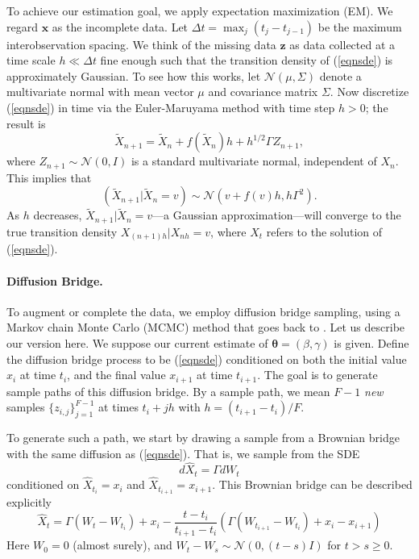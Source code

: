 \documentclass{article}
\newcommand{\btheta}{\ensuremath{\bm{\theta}}}
\newcommand{\bx}{\ensuremath{\mathbf{x}}}
\newcommand{\bz}{\ensuremath{\mathbf{z}}}
\begin{document}
To achieve our estimation goal, we apply expectation maximization (EM).  We regard $\bx$ as the incomplete data.  Let $\Delta t = \max_{j} (t_j - t_{j-1})$ be the maximum interobservation spacing.  We think of the missing data $\bz$ as data collected at a time scale $h \ll \Delta t$ fine enough such that the transition density of (\ref{eqnsde}) is approximately Gaussian.  To see how this works, let $\mathcal{N}(\mu, \Sigma)$ denote a multivariate normal with mean vector $\mu$ and covariance matrix $\Sigma$.  Now discretize (\ref{eqnsde}) in time via the Euler-Maruyama method with time step $h > 0$; the result is
\begin{equation} \label{eqneuler}
\widetilde{X}_{n+1} = \widetilde{X}_n + f(\widetilde{X}_n) h + h^{1/2} \Gamma Z_{n+1},
\end{equation}
where $Z_{n+1} \sim \mathcal{N}(0, I)$ is a standard multivariate normal, independent of $X_n$.  This implies that
\begin{equation}
\label{eqncondden}
(\widetilde{X}_{n+1} | \widetilde{X}_n = v) \sim \mathcal{N}(v + f(v) h, h \Gamma^2).
\end{equation}
As $h$ decreases, $\widetilde{X}_{n+1} | \widetilde{X}_n = v$---a Gaussian approximation---will converge to the true transition density $X_{(n+1)h} | X_{nh} = v$, where $X_t$ refers to the solution of (\ref{eqnsde}).

\paragraph{Diffusion Bridge.} To augment or complete the data, we employ diffusion bridge sampling, using a Markov chain Monte Carlo (MCMC) method that goes back to \cite{roberts_inference_2001, papaspiliopoulos_data_2013}.  Let us describe our version here.  We suppose our current estimate of $\btheta = (\beta, \gamma)$ is given.  Define the diffusion bridge process to be (\ref{eqnsde}) conditioned on both the initial value $x_i$ at time $t_i$, and the final value $x_{i+1}$ at time $t_{i+1}$.  The goal is to generate sample paths of this diffusion bridge.  By a sample path, we mean $F-1$ \emph{new} samples $\{z_{i,j}\}_{j=1}^{F-1}$ at times $t_i + j h$ with $h = (t_{i+1} - t_i)/F$.

To generate such a path, we start by drawing a sample from a Brownian bridge with the same diffusion as (\ref{eqnsde}).  That is, we sample from the SDE
\begin{equation}
\label{eqnbbridgesde}
d\widehat{X}_t = \Gamma dW_t
\end{equation}
conditioned on $\widehat{X}_{t_i} = x_i$ and $\widehat{X}_{t_{i+1}} = x_{i+1}$.  This Brownian bridge can be described explicitly
\begin{equation}
\label{eqnbbridge}
\widehat{X}_t = \Gamma (W_{t} - W_{t_i}) + x_i - \frac{t - t_i}{t_{i+1} - t_i} (\Gamma (W_{t_{i+1}} - W_{t_i}) + x_{i} - x_{i+1} )
\end{equation}
Here $W_0 = 0$ (almost surely), and $W_t - W_s \sim \mathcal{N}(0, (t-s)I)$ for $t > s \geq 0$. 
\end{document}
